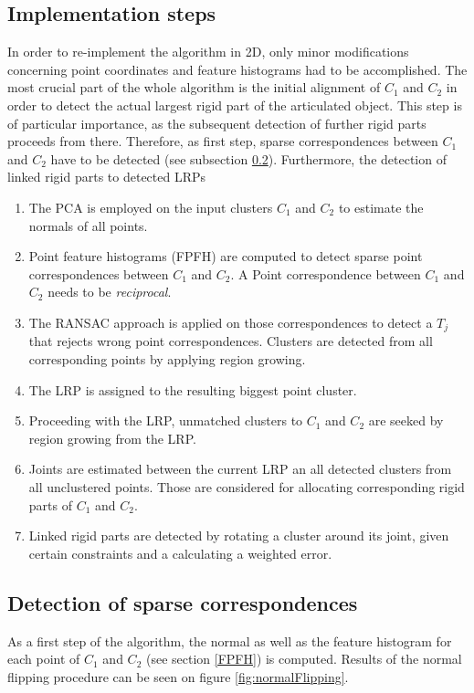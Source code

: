 \subsection{Implementation steps}
In order to re-implement the algorithm in 2D, only minor modifications concerning point coordinates and feature histograms had to be accomplished. The most crucial part of the whole algorithm is the initial alignment of $C_1$ and $C_2$ in order to detect the actual largest rigid part of the articulated object. This step is of particular importance, as the subsequent detection of further rigid parts proceeds from there. Therefore, as first step, sparse correspondences between $C_1$ and $C_2$ have to be detected (see subsection \ref{correspondences}). Furthermore, the detection of linked rigid parts to detected LRPs
\begin{enumerate}
	\item The PCA is employed on the input clusters $C_1$ and $C_2$ to estimate the normals of all points.
	\item Point feature histograms (FPFH) are computed to detect sparse point correspondences between $C_1$ and $C_2$. A Point correspondence between $C_1$ and $C_2$ needs to be \textit{reciprocal}.
	\item The RANSAC approach is applied on those correspondences to detect a $T_j$ that rejects wrong point correspondences. Clusters are detected from all corresponding points by applying region growing.
	\item The LRP is assigned to the resulting biggest point cluster.
	\item Proceeding with the LRP, unmatched clusters to $C_1$ and $C_2$ are seeked by region growing from the LRP. 
	\item Joints are estimated between the current LRP an all detected clusters from all unclustered points. Those are considered for allocating corresponding rigid parts of $C_1$ and $C_2$.
	\item Linked rigid parts are detected by rotating a cluster around its joint, given certain constraints and a calculating a weighted error.
\end{enumerate}

\subsection{Detection of sparse correspondences}
\label{correspondences}

As a first step of the algorithm, the normal as well as the feature histogram for each point of $C_1$ and $C_2$ (see section \ref{FPFH}) is computed. Results of the normal flipping procedure can be seen on figure \ref{fig:normalFlipping}.

